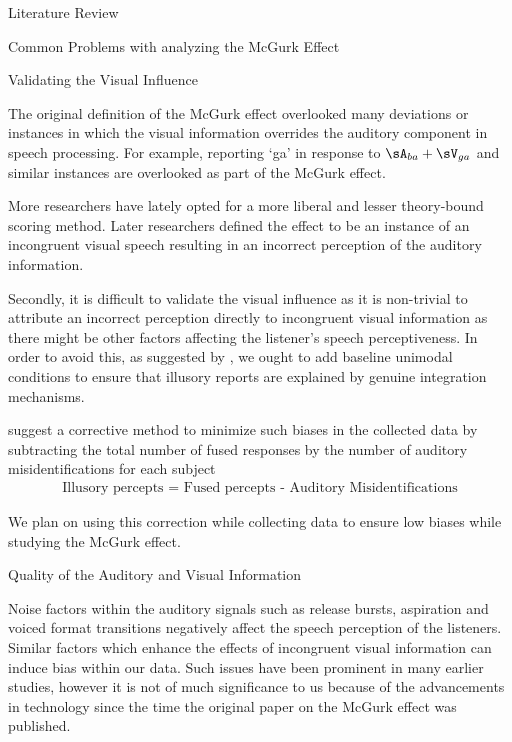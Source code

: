 \documentclass{article}
\begin{document}
\begin{psection}{Literature Review}
\begin{psubsection}{Common Problems with analyzing the McGurk Effect}
		\begin{pssubsection}{Validating the Visual Influence}

			The original definition of the McGurk effect overlooked many deviations or instances in which the visual information overrides the auditory component in speech processing. For example, reporting `ga' in response to $\sA_{ba} + \sV_{ga}$ and similar instances are overlooked as part of the McGurk effect.

			More researchers have lately opted for a more liberal and lesser theory-bound scoring method. Later researchers defined the effect to be an instance of an incongruent visual speech resulting in an incorrect perception of the auditory information.

			Secondly, it is difficult to validate the visual influence as it is non-trivial to attribute an incorrect perception directly to incongruent visual information as there might be other factors affecting the listener's speech perceptiveness. In order to avoid this, as suggested by \cite{40-years}, we ought to add baseline unimodal conditions to ensure that illusory reports are explained by genuine integration mechanisms.

			 \cite{40-years} suggest a corrective method to minimize such biases in the collected data by subtracting the total number of fused responses by the number of auditory misidentifications for each subject \ie
			\begin{align*}
				\text{Illusory percepts = Fused percepts - Auditory Misidentifications}
			\end{align*}

			We plan on using this correction while collecting data to ensure low biases while studying the McGurk effect.

		\end{pssubsection}

		\begin{pssubsection}{Quality of the Auditory and Visual Information}

			Noise factors within the auditory signals such as release bursts, aspiration and voiced format transitions negatively affect the speech perception of the listeners. Similar factors which enhance the effects of incongruent visual information can induce bias within our data. Such issues have been prominent in many earlier studies, however it is not of much significance to us because of the advancements in technology since the time the original paper on the McGurk effect was published.


\end{pssubsection}
\end{psubsection}
\end{psection}
\end{document}
